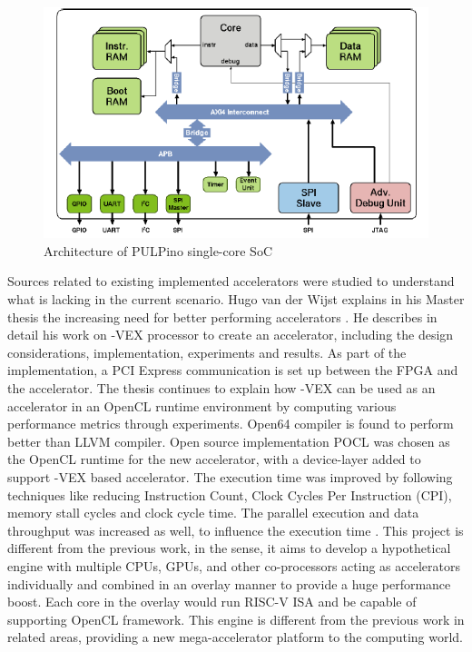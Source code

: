 \begin{figure}[h!]
  \includegraphics[width=\linewidth]{figures/pulpino.PNG}
  \caption{Architecture of PULPino single-core SoC
  \cite{pulpino}}
  \label{fig:pulpino}
\end{figure}
Sources related to existing implemented accelerators were studied to understand what is lacking in the current scenario. Hugo van der Wijst explains in his Master thesis the increasing need for better performing accelerators
\cite{thesis_2015}. He describes in detail his work on \textrho-VEX processor to create an accelerator, including the design considerations, implementation, experiments and results. As part of the implementation, a PCI Express communication is set up between the FPGA and the accelerator. \newline\newline 
The thesis continues to explain how \textrho-VEX can be used as an accelerator in an OpenCL runtime environment by computing various performance metrics through experiments. Open64 compiler is found to perform better than LLVM compiler. Open source implementation POCL was chosen as the OpenCL runtime for the new accelerator, with a device-layer added to support \textrho-VEX based accelerator. The execution time was improved by following techniques like reducing Instruction Count, Clock Cycles Per Instruction (CPI), memory stall cycles and clock cycle time. The parallel execution and data throughput was increased as well, to influence the execution time  \cite{thesis_2015}.\newline\newline
This project is different from the previous work, in the sense, it aims to develop a hypothetical engine with multiple CPUs, GPUs, and other co-processors acting as accelerators individually and combined in an overlay manner to provide a huge performance boost. Each core in the overlay would run RISC-V ISA and be capable of supporting OpenCL framework. This engine is different from the previous work in related areas, providing a new mega-accelerator platform to the computing world.
